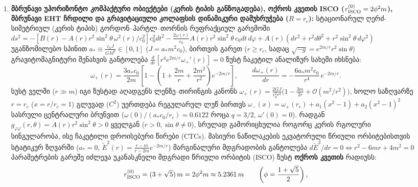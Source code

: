 \documentclass[11pt,a4paper]{article}
\begin{document}
\begin{enumerate}[label=\arabic*.]
\item \textbf{მბრუნავი უჰორიზონტო კომპაქტური ობიექტები (კერის ტიპის განზოგადება), ოქროს კვეთის ISCO ($r_{\rm ISCO}^{(0)} = 2\phi^2 m$), მბრუნავი EHT ჩრდილი და გრავიტაციული კოლაფსის დინამიკური დამუხრუჭება ($R = r_c$):} სტაციონარულ ღერძ-სიმეტრიულ (კერის ტიპის) გორდონ–ჰარტლ–თორნის რეფრაქციულ გარემოში $ds^2 = -[B(r) - A(r)r^2\sin^2\theta\,\omega^2(r)/c_0^2]c_0^2 dt^2 - \frac{2\omega(r)}{c_0}A(r)r^2\sin^2\theta\,c_0 dt\,d\varphi + A(r)(dr^2 + r^2 d\theta^2 + r^2\sin^2\theta\,d\varphi^2)$ უგანზომილებო სპინით $a_* \equiv \frac{c_0 J}{G M^2} \in [0, 1]$ ($J = a_* m^2 c_0$), ბირთვის გარეთ ($r \ge r_c$, სადაც $\sqrt{-g} = e^{2m/r}r^2\sin\theta$) გრავიტომაგნიტური შენახვის განტოლება $\frac{d}{dr}[r^4 e^{2m/r}\omega_+'(r)] = 0$ ზუსტ ჩაკეტილ ანალიზურ სახეში იხსნება:
\[
   \omega_+(r) = \frac{3 a_* c_0}{2 m}\left[1 - \left(1 + \frac{2m}{r} + \frac{2m^2}{r^2}\right)e^{-2m/r}\right], \qquad \frac{d\omega_+(r)}{dr} = -\frac{6 a_* m^2 c_0}{r^4}\,e^{-2m/r}.
\]
სუსტ ველში ($r \gg m$) იგი ზუსტად აღადგენს ლენზე–თირინგის კანონს $\omega_+(r) = \frac{2 G J}{c_0^2 r^3}\bigl(1 - \frac{3m}{2r} + \mathcal{O}(m^2/r^2)\bigr)$, ხოლო საზღვარზე $r = r_c$ ($x = r/r_c = 1$) გლუვად ($C^2$) უერთდება რეგულარულ ლუწ ბირთვს $\omega_-(x) = \omega_+(r_c) + a_1(x^2-1) + a_2(x^2-1)^2$ სასრული ცენტრალური ბრუნვით ($\omega(0)/(a_* c_0/r_c) = 0.6122$ როცა $q = 3/2$, $\omega'(0) = 0$). რადგან $g_{\varphi\varphi}(r,\theta) = A(r)r^2\sin^2\theta > 0$ ყველგან ($r > 0, \sin\theta \neq 0$), სრულად გამორიცხულია როგორც კერის რგოლური სინგულარობა, ისე ჩაკეტილი დროისებური წირები (CTCs). მასიური ნაწილაკების ეკვატორული წრიული ორბიტებისთვის სტატიკურ ზღვარში ($a_* = 0$, $\tilde{E}^2(r) = \frac{r-m}{r-2m}e^{-2m/r}$) მარგინალური მდგრადობის განტოლება $d\tilde{E}^2/dr = 0 \iff r^2 - 6mr + 4m^2 = 0$ პარამეტრების გარეშე იძლევა უკანასკნელი მდგრადი წრიული ორბიტის (ISCO) ზუსტ \textbf{ოქროს კვეთის} რადიუსს:
\[
   r_{\rm ISCO}^{(0)} = (3 + \sqrt{5})\,m = 2\phi^2 m \approx 5.2361\,m \qquad \left(\phi = \frac{1+\sqrt{5}}{2}\right),
\]

\end{enumerate}
\end{document}
